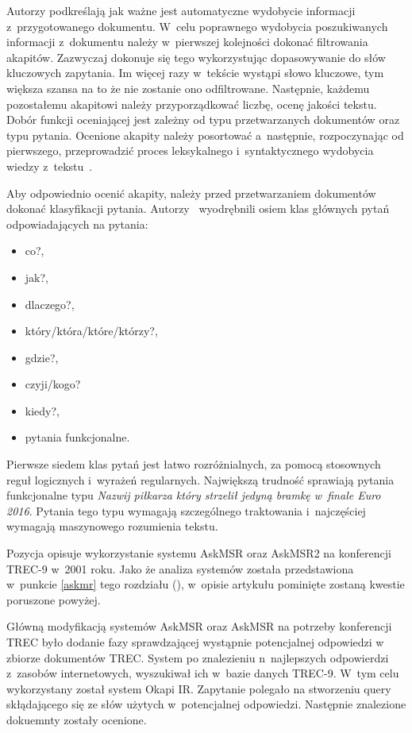 Autorzy podkreślają jak ważne jest automatyczne wydobycie informacji z~przygotowanego dokumentu. W~celu poprawnego wydobycia poszukiwanych informacji z~dokumentu należy w~pierwszej kolejności dokonać filtrowania akapitów. Zazwyczaj dokonuje się tego wykorzystując dopasowywanie do słów kluczowych zapytania. Im więcej razy w~tekście wystąpi słowo kluczowe, tym większa szansa na to że nie zostanie ono odfiltrowane. Następnie, każdemu pozostałemu akapitowi należy przyporządkować liczbę, ocenę jakości tekstu.
Dobór funkcji oceniającej jest zależny od typu przetwarzanych dokumentów oraz typu pytania. Ocenione akapity należy posortować a~następnie, rozpoczynając od pierwszego, przeprowadzić proces leksykalnego i~syntaktycznego wydobycia wiedzy z~tekstu~\cite{gupta2012survey}.

Aby odpowiednio ocenić akapity, należy przed przetwarzaniem dokumentów dokonać klasyfikacji pytania. Autorzy~\cite{gupta2012survey} wyodrębnili osiem klas głównych pytań odpowiadających na pytania:
\begin{itemize}
	\item co?,
	\item jak?,
	\item dlaczego?,
	\item który/która/które/którzy?,
	\item gdzie?,
	\item czyji/kogo?
	\item kiedy?,
	\item pytania funkcjonalne.
\end{itemize}

Pierwsze siedem klas pytań jest łatwo rozróżnialnych, za pomocą stosownych reguł logicznych i~wyrażeń regularnych. Największą trudność sprawiają pytania funkcjonalne typu \emph{Nazwij piłkarza który strzelił jedyną bramkę w~finale Euro 2016}. Pytania tego typu wymagają szczególnego traktowania i~najczęściej wymagają maszynowego rozumienia tekstu.

Pozycja \cite{brill2001data} opisuje wykorzystanie systemu AskMSR oraz AskMSR2 na konferencji TREC-9 w~2001 roku. Jako że analiza systemów została przedstawiona w~punkcie \ref{askmr} tego rozdziału (\cite{brill2002analysis}), w~opisie artykułu pominięte zostaną kwestie poruszone powyżej.

Główną modyfikacją systemów AskMSR oraz AskMSR na potrzeby konferencji TREC było dodanie fazy sprawdzającej wystąpnie potencjalnej odpowiedzi w zbiorze dokumentów TREC. System po znalezieniu n~najlepszych odpowierdzi z~zasobów internetowych, wyszukiwał ich w~bazie danych TREC-9. W~tym celu wykorzystany został system Okapi IR. Zapytanie polegało na stworzeniu query skłądającego się ze słów użytych w~potencjalnej odpowiedzi. Następnie znalezione dokuemnty zostały ocenione.

